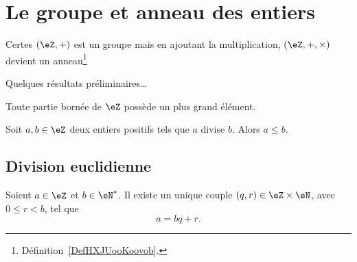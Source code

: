 
\section{Le groupe et anneau des entiers}

Certes \( (\eZ,+)\) est un groupe mais en ajoutant la multiplication, \( (\eZ,+,\times)\) devient un anneau\footnote{Définition~\ref{DefHXJUooKoovob}.} 

Quelques résultats préliminaires\dots


\begin{lemma}       \label{LEMooMYEIooNFwNVI}
    Toute partie bornée de \( \eZ\) possède un plus grand élément.
\end{lemma}

\begin{proposition}     \label{PROPooYJBMooZrzkNX}
    Soit \( a,b\in \eZ\) deux entiers positifs tels que \( a\) divise \( b\). Alors \( a\leq b\).
\end{proposition}

\subsection{Division euclidienne}

\begin{theorem}     \label{ThoDivisEuclide}
    Soient \( a\in\eZ\) et \( b\in\eN^*\). Il existe un unique couple \( (q,r)\in\eZ\times\eN\), avec \( 0\leq r<b\), tel que
    \begin{equation}
        a=bq+r.
    \end{equation}
\end{theorem}

